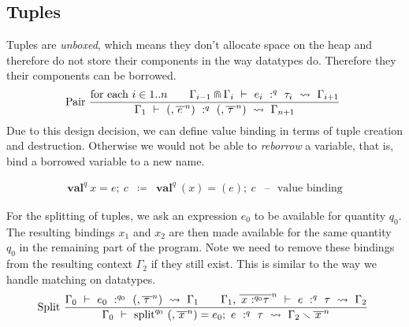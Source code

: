 \subsection{Tuples}

Tuples are \emph{unboxed}, which means they don't allocate space on the
heap and therefore do not store their components in the way datatypes
do. Therefore they their components can be borrowed.
\[\text{Pair}\ \frac{{\text{for each }i \in 1..n}\text{\quad\quad}{\Gamma_{i - 1} \Cap \Gamma_{i}\  \vdash \ e_{i}\ :^{q}\ \tau_{i}\  \rightsquigarrow \ \Gamma_{i + 1}}}{\Gamma_{1}\  \vdash \ {(,{\overline{\, e\:}}^{n})}\ :^{q}\ {(,{\overline{\,\tau\:}}^{n})}\  \rightsquigarrow \ \Gamma_{n + 1}}\ \]
Due to this design decision, we can define value binding in terms of
tuple creation and destruction. Otherwise we would not be able to
\emph{reborrow} a variable, that is, bind a borrowed variable to a new
name.



\[\begin{array}{llll}
{\mathsf{\mathbf{\text{val}}}^{q}\ x = e;\ c} & ≔ & {\mathsf{\mathbf{\text{val}}}^{q}\ (x) = (e);\ c} & \text{– }\text{ value binding}
\end{array}\]

For the splitting of tuples, we ask an expression \(e_{0}\) to be
available for quantity \(q_{0}\). The resulting bindings \(x_{1}\) and
\(x_{2}\) are then made available for the same quantity \(q_{0}\) in the
remaining part of the program. Note we need to remove these bindings
from the resulting context \(\Gamma_{2}\) if they still exist. This is
similar to the way we handle matching on datatypes.
\[\text{Split}\ \frac{{\Gamma_{0}\  \vdash \ e_{0}\ :^{q_{0}}\ {(,{\overline{\,\tau\:}}^{n})}\  \rightsquigarrow \ \Gamma_{1}}\text{\quad\quad}{\Gamma_{1}{,\ }{\overline{\,{x\text{ :}^{q_{0}}\tau}\:}}^{n}\  \vdash \ e\ :^{q}\ \tau\  \rightsquigarrow \ \Gamma_{2}}}{\Gamma_{0}\  \vdash \ {\mathsf{\mathbf{\text{split}}}^{q_{0}}\ {(,{\overline{\, x\:}}^{n})} = e_{0};\ e}\ :^{q}\ \tau\  \rightsquigarrow \ \Gamma_{2} \smallsetminus {\overline{\, x\:}}^{n}}\ \]

